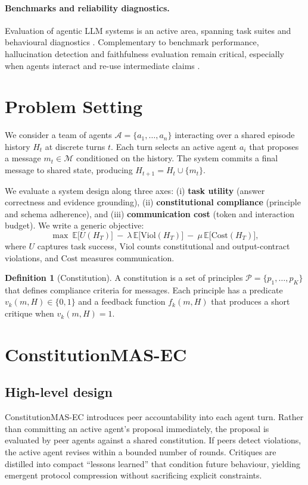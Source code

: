 \documentclass{article}
\newcommand{\framework}{ConstitutionMAS-EC\xspace}
\theoremstyle{plain}
\theoremstyle{definition}
\newtheorem{definition}[theorem]{Definition}
\begin{document}
\paragraph{Benchmarks and reliability diagnostics.}
Evaluation of agentic LLM systems is an active area, spanning task suites and behavioural diagnostics \citep{gao2023agentbench}. Complementary to benchmark performance, hallucination detection and faithfulness evaluation remain critical, especially when agents interact and re-use intermediate claims \citep{li2023selfcheckgpt,deyoung2020eraser}.

\section{Problem Setting}
\label{sec:setting}
We consider a team of agents $\mathcal{A}=\{a_1,\dots,a_n\}$ interacting over a shared episode history $H_t$ at discrete turns $t$. Each turn selects an active agent $a_i$ that proposes a message $m_t \in \mathcal{M}$ conditioned on the history. The system commits a final message to shared state, producing $H_{t+1}=H_t \cup \{m_t\}$.

We evaluate a system design along three axes:
(i) \textbf{task utility} (answer correctness and evidence grounding),
(ii) \textbf{constitutional compliance} (principle and schema adherence), and
(iii) \textbf{communication cost} (token and interaction budget).
We write a generic objective:
\begin{equation}
\max \ \mathbb{E}\big[U(H_T)\big] \ - \ \lambda \, \mathbb{E}\big[\mathrm{Viol}(H_T)\big] \ - \ \mu \, \mathbb{E}\big[\mathrm{Cost}(H_T)\big],
\label{eq:objective}
\end{equation}
where $U$ captures task success, $\mathrm{Viol}$ counts constitutional and output-contract violations, and $\mathrm{Cost}$ measures communication.

\begin{definition}[Constitution]
A constitution is a set of principles $\mathcal{P}=\{p_1,\dots,p_K\}$ that defines compliance criteria for messages. Each principle has a predicate $v_k(m,H)\in\{0,1\}$ and a feedback function $f_k(m,H)$ that produces a short critique when $v_k(m,H)=1$.
\end{definition}

\section{\framework}
\label{sec:method}
\subsection{High-level design}
\framework introduces peer accountability into each agent turn. Rather than committing an active agent's proposal immediately, the proposal is evaluated by peer agents against a shared constitution. If peers detect violations, the active agent revises within a bounded number of rounds. Critiques are distilled into compact ``lessons learned'' that condition future behaviour, yielding emergent protocol compression without sacrificing explicit constraints.
\end{document}
